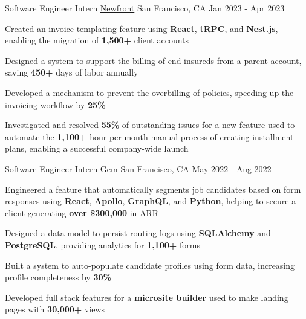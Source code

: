 
\begin{cventries}
  \cventry
    {Software Engineer Intern} %
    {\href{https://www.newfront.com/}{Newfront}} %
    {San Francisco, CA} %
    {Jan 2023 - Apr 2023} %
    {
      \begin{cvitems} %
      \item {Created an invoice templating feature using \textbf{React}, \textbf{tRPC}, and \textbf{Nest.js}, enabling the migration of \textbf{1,500+} client accounts}
      \item {Designed a system to support the billing of end-insureds from a parent account, saving \textbf{450+} days of labor annually}
      \item {Developed a mechanism to prevent the overbilling of policies, speeding up the invoicing workflow by \textbf{25\%}}
      \item {Investigated and resolved \textbf{55\%} of outstanding issues for a new feature used to automate the \textbf{1,100+} hour per month manual process of creating installment plans, enabling a successful company-wide launch}
      \end{cvitems}
    }

  \cventry
    {Software Engineer Intern} %
    {\href{https://www.gem.com/}{Gem}} %
    {San Francisco, CA} %
    {May 2022 - Aug 2022} %
    {
      \begin{cvitems} %
      \item {Engineered a feature that automatically segments job candidates based on form responses using \textbf{React}, \textbf{Apollo}, \textbf{GraphQL}, and \textbf{Python}, helping to secure a client generating \textbf{over \$300,000} in ARR}
      \item {Designed a data model to persist routing logs using \textbf{SQLAlchemy} and \textbf{PostgreSQL}}, providing analytics for \textbf{1,100+} forms
      \item {Built a system to auto-populate candidate profiles using form data, increasing profile completeness by \textbf{30\%}}
      \item {Developed full stack features for a \textbf{microsite builder} used to make landing pages with \textbf{30,000+} views}
      \end{cvitems}
    }


\end{cventries}
